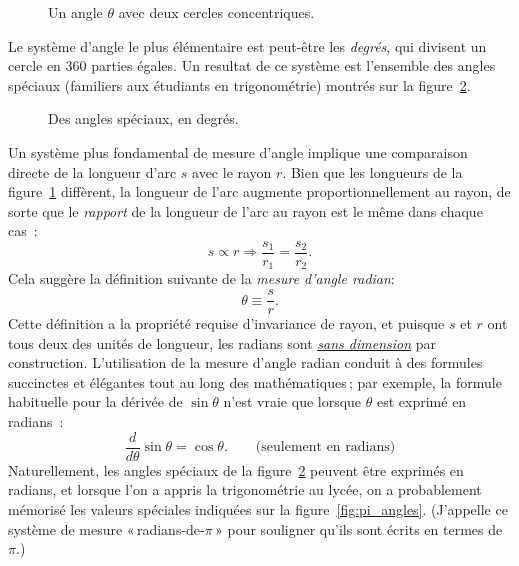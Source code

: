 \begin{figure}
\begin{center}
\end{center}
\caption{Un angle $\theta$ avec deux cercles concentriques.\label{fig:angle_arclength}}
\end{figure}

Le système d'angle le plus élémentaire est peut-être les \emph{degrés}, qui divisent un cercle en 360 parties égales. Un resultat de ce système est l'ensemble des angles spéciaux (familiers aux étudiants en trigonométrie) montrés sur la figure~\ref{fig:degree_angles}.

\begin{figure}
\begin{center}
\end{center}
\caption{Des angles spéciaux, en degrés.\label{fig:degree_angles}}
\end{figure}

Un système plus fondamental de mesure d'angle implique une comparaison directe de la longueur d'arc $s$ avec le rayon $r$. Bien que les longueurs de la figure~\ref{fig:angle_arclength} diffèrent, la longueur de l'arc augmente proportionnellement au rayon, de sorte que le \emph{rapport} de la longueur de l'arc au rayon est le même dans chaque cas~:
\[
s\propto r \Rightarrow \frac{s_1}{r_1} = \frac{s_2}{r_2}.
\]
Cela suggère la définition suivante de la \emph{mesure d'angle radian}:
\begin{equation}
\label{eq:radians}
\theta \equiv \frac{s}{r}.
\end{equation}
Cette définition a la propriété requise d'invariance de rayon, et puisque $s$ et $r$ ont tous deux des unités de longueur, les radians sont \href{https://fr.wikipedia.org/wiki/Grandeur_sans_dimension}{\emph{sans dimension}} par construction. L'utilisation de la mesure d'angle radian conduit à des formules succinctes et élégantes tout au long des mathématiques\,; par exemple, la formule habituelle pour la dérivée de $\sin\theta$ n'est vraie que lorsque $\theta$ est exprimé en radians~:
\[
  \frac{d}{d\theta}\sin\theta = \cos\theta. \qquad\mbox{(seulement en radians)}
\]
Naturellement, les angles spéciaux de la figure~\ref{fig:degree_angles} peuvent être exprimés en radians, et lorsque l'on a appris la trigonométrie au lycée, on a probablement mémorisé les valeurs spéciales indiquées sur la figure~\ref{fig:pi_angles}. (J'appelle ce système de mesure «\,radians-de-$\pi$\,» pour souligner qu'ils sont écrits en termes de $\pi$.)

